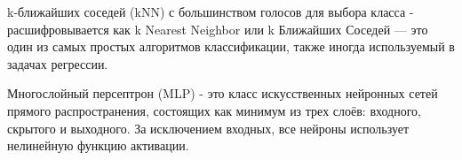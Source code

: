 k-ближайших соседей (kNN) с большинством голосов для выбора класса - 
расшифровывается как k Nearest Neighbor или k Ближайших Соседей — это один из самых простых алгоритмов классификации, также иногда используемый в задачах регрессии. 

Многослойный персептрон (MLP) -  это класс искусственных нейронных сетей прямого распространения, состоящих как минимум из трех слоёв: входного, скрытого и выходного.
За исключением входных, все нейроны использует нелинейную функцию активации.








